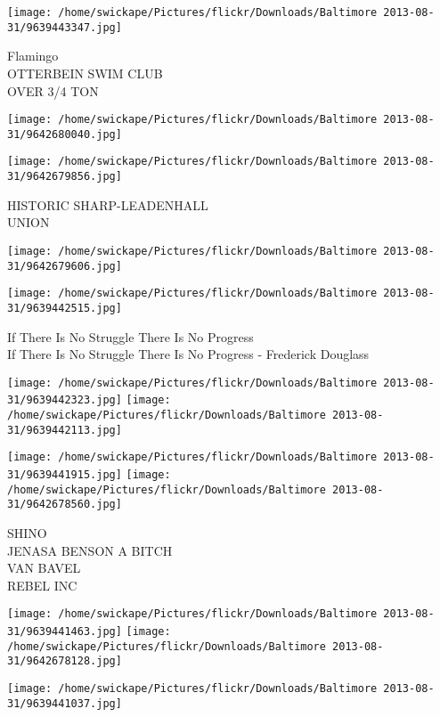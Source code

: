 \documentclass[10pt,letterpaper]{article}
\begin{document}
\texttt{[image: /home/swickape/Pictures/flickr/Downloads/Baltimore 2013-08-31/9639443347.jpg]}

Flamingo\\
OTTERBEIN SWIM CLUB\\
OVER 3/4 TON\\
\pagebreak

\texttt{[image: /home/swickape/Pictures/flickr/Downloads/Baltimore 2013-08-31/9642680040.jpg]}

\vspace{0.25in}
\texttt{[image: /home/swickape/Pictures/flickr/Downloads/Baltimore 2013-08-31/9642679856.jpg]}

HISTORIC SHARP{-}LEADENHALL\\
UNION\\
\pagebreak

\texttt{[image: /home/swickape/Pictures/flickr/Downloads/Baltimore 2013-08-31/9642679606.jpg]}

\vspace{0.25in}
\texttt{[image: /home/swickape/Pictures/flickr/Downloads/Baltimore 2013-08-31/9639442515.jpg]}

If There Is No Struggle There Is No Progress\\
If There Is No Struggle There Is No Progress {-} Frederick Douglass\\
\pagebreak

\texttt{[image: /home/swickape/Pictures/flickr/Downloads/Baltimore 2013-08-31/9639442323.jpg]}
\texttt{[image: /home/swickape/Pictures/flickr/Downloads/Baltimore 2013-08-31/9639442113.jpg]}

\texttt{[image: /home/swickape/Pictures/flickr/Downloads/Baltimore 2013-08-31/9639441915.jpg]}
\texttt{[image: /home/swickape/Pictures/flickr/Downloads/Baltimore 2013-08-31/9642678560.jpg]}

SHINO\\
JENASA BENSON A BITCH\\
VAN BAVEL\\
REBEL INC\\
\pagebreak

\texttt{[image: /home/swickape/Pictures/flickr/Downloads/Baltimore 2013-08-31/9639441463.jpg]}
\texttt{[image: /home/swickape/Pictures/flickr/Downloads/Baltimore 2013-08-31/9642678128.jpg]}

\texttt{[image: /home/swickape/Pictures/flickr/Downloads/Baltimore 2013-08-31/9639441037.jpg]}
\end{document}
